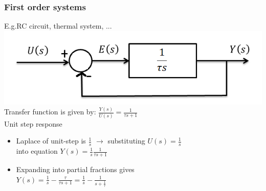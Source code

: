 \begin{frame}
\frametitle{First order systems}
E.g.RC circuit, thermal system, ...
\vspace{0.25cm}
\\ \includegraphics[width=0.7\linewidth]{Afbeelding1}
\vspace{0.5cm}
\pause
\\Transfer function is given by: $\frac{Y(s)}{U(s)} = \frac{1}{\tau s +1}$
\vspace{0.25cm}
\pause
\\Unit step response
\begin{itemize}
\vspace{0.25cm}
\item Laplace of unit-step is $\frac{1}{s}$ $\rightarrow$ substituting $U(s)= \frac{1}{s}$ \\
\vspace{0.25cm}
into equation $Y(s) = \frac{1}{s}\frac{1}{\tau s +1}$
\vspace{0.25cm}
\item Expanding into partial fractions gives
\vspace{0.25cm}
\\ $Y(s)= \frac{1}{s} - \frac{\tau}{\tau s +1} = \frac{1}{s} - \frac{1}{s+\frac{1}{\tau}}$
\end{itemize}
\end{frame}

